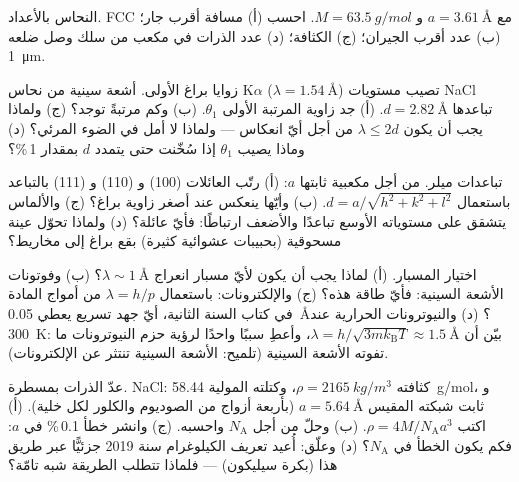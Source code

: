 \begin{exercise}[$\star$]\label{exo:b3:crystalline-solids:2}
النحاس بالأعداد. FCC مع $a = \qty{3.61}{\angstrom}$ و $M =
\qty{63.5}{g/mol}$. احسب (أ) مسافة أقرب جار؛
(ب) عدد أقرب الجيران؛ (ج) الكثافة؛ (د)
عدد الذرات في مكعب من سلك وصل ضلعه \qty{1}{\micro m}.
\end{exercise}

\begin{exercise}[$\star$]\label{exo:b3:crystalline-solids:3}
زوايا براغ الأولى. أشعة سينية من نحاس K$\alpha$
($\lambda = \qty{1.54}{\angstrom}$) تصيب مستويات NaCl تباعدها
$d = \qty{2.82}{\angstrom}$. (أ) جد زاوية المرتبة الأولى
$\theta_1$. (ب) وكم مرتبةً توجد؟ (ج) ولماذا يجب أن يكون
$\lambda \le 2d$ من أجل أيّ انعكاس --- ولماذا لا أمل في الضوء
المرئي؟ (د) وماذا يصيب $\theta_1$ إذا سُخّنت 
حتى يتمدد $d$ بمقدار 1\,\%؟
\end{exercise}

\begin{exercise}[$\star$]\label{exo:b3:crystalline-solids:4}
تباعدات ميلر. من أجل  مكعبية ثابتها $a$: (أ) رتّب
العائلات (100) و (110) و (111) بالتباعد باستعمال
$d = a/\sqrt{h^2+k^2+l^2}$. (ب) وأيّها ينعكس عند أصغر
زاوية براغ؟ (ج) والألماس يتشقق على مستوياته الأوسع تباعدًا والأضعف
ارتباطًا: فأيّ عائلة؟ (د) ولماذا تحوّل عينة مسحوقية
(بحبيبات عشوائية كثيرة) بقع براغ إلى مخاريط؟
\end{exercise}

\begin{exercise}[$\star\star$]\label{exo:b3:crystalline-solids:5}
اختيار المسبار. (أ) لماذا يجب أن يكون لأيّ مسبار انعراج
$\lambda \sim \qty{1}{\angstrom}$؟ (ب) وفوتونات الأشعة السينية: فأيّ طاقة
هذه؟ (ج) والإلكترونات: باستعمال $\lambda = h/p$ من أمواج المادة في
كتاب السنة الثانية، أيّ جهد تسريع يعطي
\qty{0.05}{\angstrom}؟ (د) والنيوترونات الحرارية عند \qty{300}{K}: بيّن أن
$\lambda = h/\sqrt{3mk_{\text{B}}T} \approx \qty{1.5}{\angstrom}$،
وأعطِ سببًا واحدًا لرؤية حزم النيوترونات ما تفوته الأشعة السينية (تلميح:
الأشعة السينية تنتثر عن الإلكترونات).
\end{exercise}

\begin{exercise}[$\star\star$]\label{exo:b3:crystalline-solids:6}
عدّ الذرات بمسطرة. NaCl: كثافته
$\rho = \qty{2165}{kg/m^3}$، وكتلته المولية \qty{58.44}{g/mol}، و
ثابت شبكته المقيس $a = \qty{5.64}{\angstrom}$ (بأربعة أزواج من الصوديوم والكلور
لكل خلية). (أ) اكتب $\rho = 4M/N_{\text{A}}a^3$. (ب) وحلّ
من أجل $N_{\text{A}}$ واحسبه. (ج) وانشر خطأ 0.1\,\% في
$a$: فكم يكون الخطأ في $N_{\text{A}}$؟ (د) وعلّق: أُعيد تعريف الكيلوغرام
سنة 2019 جزئيًّا عبر طريق  هذا (بكرة سيليكون)
--- فلماذا تتطلب الطريقة  شبه تامّة؟
\end{exercise}

